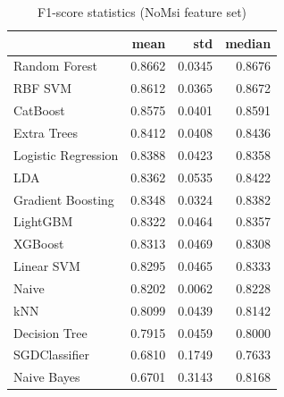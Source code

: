 \begin{table}
\caption{F1-score statistics (NoMsi feature set)}
\label{tab:f1_NoMsi_stats}
\begin{tabular}{lrrr}
\toprule
 & mean & std & median \\
\midrule
Random Forest & 0.8662 & 0.0345 & 0.8676 \\
RBF SVM & 0.8612 & 0.0365 & 0.8672 \\
CatBoost & 0.8575 & 0.0401 & 0.8591 \\
Extra Trees & 0.8412 & 0.0408 & 0.8436 \\
Logistic Regression & 0.8388 & 0.0423 & 0.8358 \\
LDA & 0.8362 & 0.0535 & 0.8422 \\
Gradient Boosting & 0.8348 & 0.0324 & 0.8382 \\
LightGBM & 0.8322 & 0.0464 & 0.8357 \\
XGBoost & 0.8313 & 0.0469 & 0.8308 \\
Linear SVM & 0.8295 & 0.0465 & 0.8333 \\
Naive & 0.8202 & 0.0062 & 0.8228 \\
kNN & 0.8099 & 0.0439 & 0.8142 \\
Decision Tree & 0.7915 & 0.0459 & 0.8000 \\
SGDClassifier & 0.6810 & 0.1749 & 0.7633 \\
Naive Bayes & 0.6701 & 0.3143 & 0.8168 \\
\bottomrule
\end{tabular}
\end{table}
